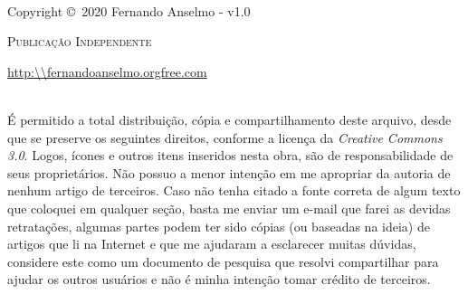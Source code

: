 \documentclass[a4paper,11pt]{book} %
\begin{document}
\begingroup
\thispagestyle{empty}
\vfill
\endgroup

\newpage
~\vfill
\thispagestyle{empty}

\noindent Copyright \copyright\ 2020 Fernando Anselmo - v1.0 %

\noindent \textsc{Publicação Independente} %

\noindent \url{http:\\fernandoanselmo.orgfree.com} %

\noindent \\ É permitido a total distribuição, cópia e compartilhamento deste arquivo, desde que se preserve os seguintes direitos, conforme a licença da \textit{Creative Commons 3.0}. Logos, ícones e outros itens inseridos nesta obra, são de responsabilidade de seus proprietários. Não possuo a menor intenção em me apropriar da autoria de nenhum artigo de terceiros. Caso não tenha citado a fonte correta de algum texto que coloquei em qualquer seção, basta me enviar um e-mail que farei as devidas retratações, algumas partes podem ter sido cópias (ou baseadas na ideia) de artigos que li na Internet e que me ajudaram a esclarecer muitas dúvidas, considere este como um documento de pesquisa que resolvi compartilhar para ajudar os outros usuários e não é minha intenção tomar crédito de terceiros. %

\end{document}
